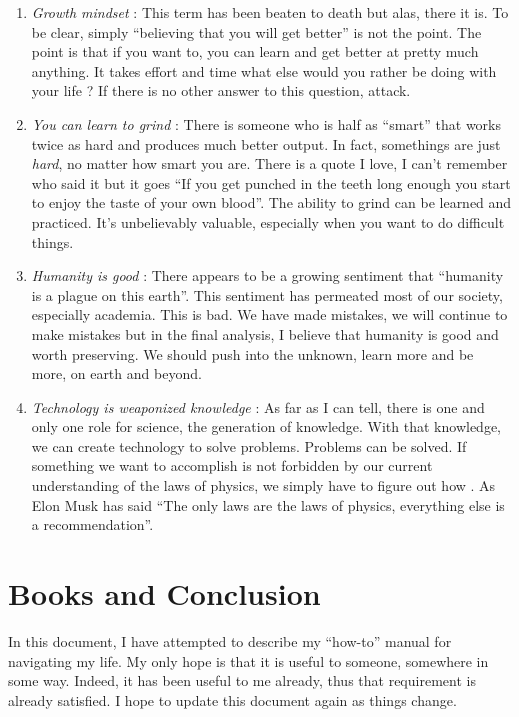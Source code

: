 \documentclass[10pt,twocolumn]{extarticle}
\begin{document}
\begin{enumerate}
    \item \textit{Growth mindset} : This term has been beaten to death but alas, there it is. To be clear, simply ``believing that you will get better'' is not the point. The point is that if you want to, you can learn and get better at pretty much anything. It takes effort and time what else would you rather be doing with your life ? If there is no other answer to this question, attack.
    \item \textit{You can learn to grind} : There is someone who is half as ``smart'' that works twice as hard and produces much better output. In fact, somethings are just \textit{hard}, no matter how smart you are. There is a quote I love, I can't remember who said it but it goes ``If you get punched in the teeth long enough you start to enjoy the taste of your own blood''. The ability to grind can be learned and practiced. It's unbelievably valuable, especially when you want to do difficult things. 
    \item \textit{Humanity is good} : There appears to be a growing sentiment that ``humanity is a plague on this earth''. This sentiment has permeated most of our society, especially academia. This is bad. We have made mistakes, we will continue to make mistakes but in the final analysis, I believe that humanity is good and worth preserving. We should push into the unknown, learn more and be more, on earth and beyond.
    \item \textit{Technology is weaponized knowledge} : As far as I can tell, there is one and only one role for science, the generation of knowledge. With that knowledge, we can create technology to solve problems. Problems can be solved. If something we want to accomplish is not forbidden by our current understanding of the laws of physics, we simply have to figure out how \cite{deutsch2011beginning}. As Elon Musk has said ``The only laws are the laws of physics, everything else is a recommendation''.
\end{enumerate}


\section{Books and Conclusion}

In this document, I have attempted to describe my ``how-to'' manual for navigating my life. My only hope is that it is useful to someone, somewhere in some way. Indeed, it has been useful to me already, thus that requirement is already satisfied. I hope to update this document again as things change.
\end{document}
